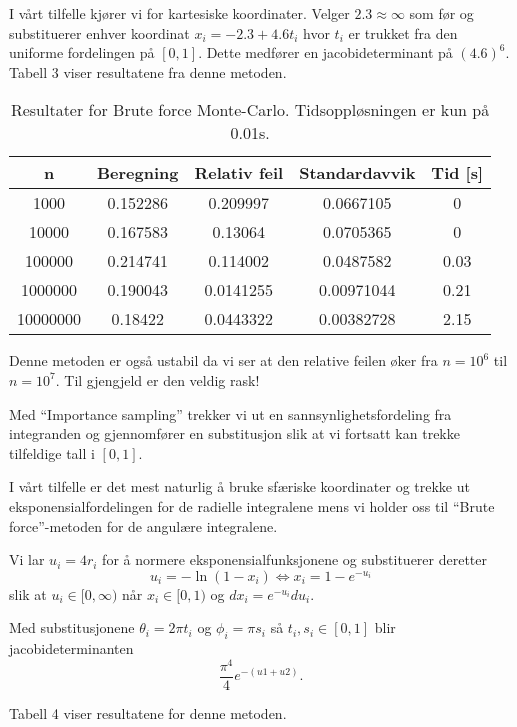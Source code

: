\documentclass[norsk, 12pt]{article}
\newcommand{\f}{\frac}
\begin{document}
I vårt tilfelle kjører vi for kartesiske koordinater. Velger $2.3\approx\infty$ som før og substituerer enhver koordinat
$x_i = -2.3+4.6t_i$ hvor $t_i$ er trukket fra den uniforme fordelingen på $[0,1]$. Dette medfører en jacobideterminant
på $(4.6)^6$. Tabell 3 viser resultatene fra denne metoden.


\begin{table}[h!]
 \centering
 \begin{tabular}{|c|c|c|c|c|}\hline
 n &Beregning &Relativ feil &Standardavvik &Tid [s] \\ \hline
1000      &0.152286      &0.209997             &0.0667105       &0\\
10000      &0.167583      &0.13064             &0.0705365       &0\\
100000      &0.214741      &0.114002             &0.0487582       &0.03\\
1000000      &0.190043      &0.0141255             &0.00971044       &0.21\\
10000000      &0.18422      &0.0443322             &0.00382728       &2.15\\ \hline
  
 \end{tabular}
\caption{Resultater for Brute force Monte-Carlo. Tidsoppløsningen er kun på 0.01s.}
\end{table}

Denne metoden er også ustabil da vi ser at den relative feilen øker fra $n=10^6$ til $n=10^7$. Til gjengjeld er den
veldig rask!


Med ``Importance sampling'' trekker vi ut en sannsynlighetsfordeling fra integranden og gjennomfører en substitusjon
slik at vi fortsatt kan trekke tilfeldige tall i $[0,1]$.

I vårt tilfelle er det mest naturlig å bruke sfæriske koordinater og trekke ut eksponensialfordelingen for de radielle
integralene mens vi holder oss til ``Brute force''-metoden for de angulære integralene.

Vi lar $u_i = 4 r_i$ for å normere eksponensialfunksjonene og substituerer deretter
$$u_i = -\ln(1-x_i) \Leftrightarrow x_i = 1-e^{-u_i}$$
slik at $u_i\in[0,\infty)$ når $x_i\in[0,1)$ og $dx_i = e^{-u_i}du_i$.

Med substitusjonene $\theta_i = 2\pi t_i$ og $\phi_i = \pi s_i$ så $t_i, s_i\in[0,1]$ blir jacobideterminanten
$$\f{\pi^4}{4}e^{-(u1+u2)}.$$

Tabell 4 viser resultatene for denne metoden.
\end{document}
